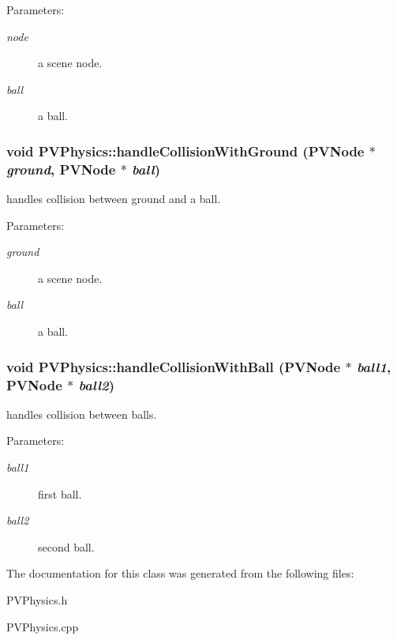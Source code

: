 \begin{Desc}
\item[Parameters:]
\begin{description}
\item[{\em node}]a scene node. \item[{\em ball}]a ball. \end{description}
\end{Desc}
\subsubsection[{handleCollisionWithGround}]{\setlength{\rightskip}{0pt plus 5cm}void PVPhysics::handleCollisionWithGround ({\bf PVNode} $\ast$ {\em ground}, \/  {\bf PVNode} $\ast$ {\em ball})}\label{class_p_v_physics_5c037709dbad69c82c4fa0437a0f6c69}


handles collision between ground and a ball. 

\begin{Desc}
\item[Parameters:]
\begin{description}
\item[{\em ground}]a scene node. \item[{\em ball}]a ball. \end{description}
\end{Desc}
\subsubsection[{handleCollisionWithBall}]{\setlength{\rightskip}{0pt plus 5cm}void PVPhysics::handleCollisionWithBall ({\bf PVNode} $\ast$ {\em ball1}, \/  {\bf PVNode} $\ast$ {\em ball2})}\label{class_p_v_physics_b33b7fee9e0d4eada11603880f2d4a40}


handles collision between balls. 

\begin{Desc}
\item[Parameters:]
\begin{description}
\item[{\em ball1}]first ball. \item[{\em ball2}]second ball. \end{description}
\end{Desc}


The documentation for this class was generated from the following files:\begin{CompactItemize}
\item 
PVPhysics.h\item 
PVPhysics.cpp\end{CompactItemize}
